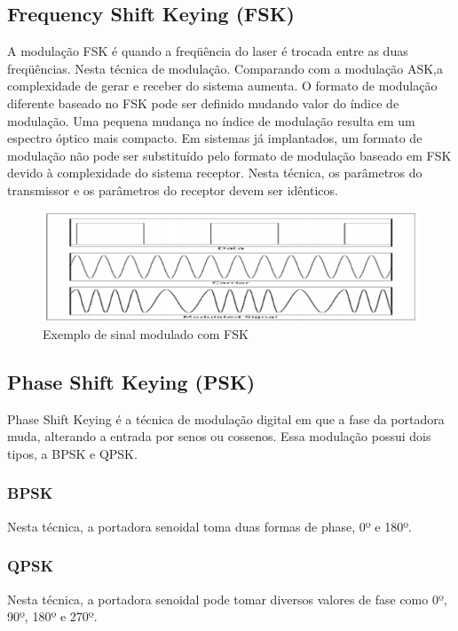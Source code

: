 \documentclass[article]{IEEEtran}
\begin{document}
\subsection{Frequency Shift Keying (FSK)}
\par A modulação FSK é quando a freqüência do laser é trocada entre as duas freqüências. Nesta técnica de modulação. Comparando com a modulação ASK,a complexidade de gerar e receber do sistema aumenta. O formato de modulação diferente baseado no FSK pode ser definido mudando valor do índice de modulação. Uma pequena mudança no índice de modulação resulta em um espectro óptico mais compacto. Em sistemas já implantados, um formato de modulação não pode ser substituído pelo formato de modulação baseado em FSK devido à complexidade do sistema receptor. Nesta técnica, os parâmetros do transmissor e os  parâmetros do receptor devem ser idênticos.

\begin{figure}[hb]
\includegraphics[width=\columnwidth]{fsk.png}
\caption{Exemplo de sinal modulado com FSK}
\end{figure}

\subsection{Phase Shift Keying (PSK)}
\par Phase Shift Keying é a técnica de modulação digital em que a fase da portadora muda, alterando a entrada por senos ou cossenos. Essa modulação possui  dois tipos, a BPSK e QPSK.
\subsubsection{BPSK}
\par Nesta técnica, a portadora senoidal toma duas formas de phase, 0º e 180º.
\subsubsection{QPSK}
\par Nesta técnica, a portadora senoidal pode tomar diversos valores de fase como 0º, 90º, 180º e 270º.
\end{document}
